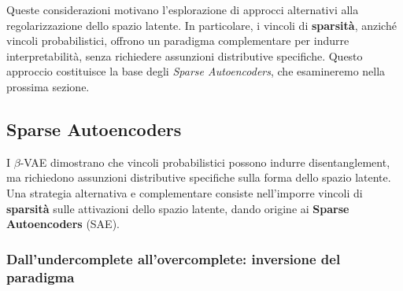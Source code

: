 Queste considerazioni motivano l'esplorazione di approcci alternativi alla regolarizzazione dello spazio latente. In particolare, i vincoli di \textbf{sparsità}, anziché vincoli probabilistici, offrono un paradigma complementare per indurre interpretabilità, senza richiedere assunzioni distributive specifiche. Questo approccio costituisce la base degli \textit{Sparse Autoencoders}, che esamineremo nella prossima sezione.

 \subsection{Sparse Autoencoders}
\label{sec:sparse_autoencoders}

I $\beta$-VAE dimostrano che vincoli probabilistici possono indurre disentanglement, ma richiedono assunzioni distributive specifiche sulla forma dello spazio latente. Una strategia alternativa e complementare consiste nell'imporre vincoli di \textbf{sparsità} sulle attivazioni dello spazio latente, dando origine ai \textbf{Sparse Autoencoders} (SAE).

\subsubsection{Dall'undercomplete all'overcomplete: inversione del paradigma}

